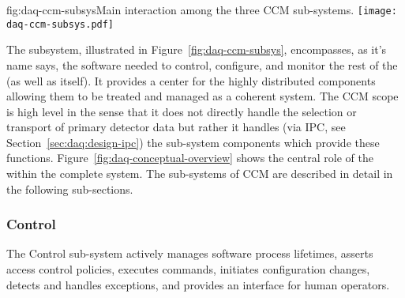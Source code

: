 
\begin{dunefigure}{fig:daq-ccm-subsys}{Main interaction among the three CCM sub-systems.}
  \texttt{[image: daq-ccm-subsys.pdf]}
\end{dunefigure}

The  subsystem, illustrated in Figure~\ref{fig:daq-ccm-subsys}, encompasses, as it's name says, the software needed to control, configure, and monitor the rest of the  (as well as itself).
It provides a center for the highly distributed  components allowing them to be treated and managed as a coherent system. 
The CCM scope is high level in the sense that it does not directly handle the selection or transport of primary detector data but rather it handles (via IPC, see Section~\ref{sec:daq:design-ipc}) the sub-system components which provide these functions.
Figure~\ref{fig:daq-conceptual-overview} shows the central role of the  within the complete  system.
The sub-systems of CCM are described in detail in the following sub-sections.


\subsubsection{Control}
\label{sec:daq:design:ccm:control}


The Control sub-system actively manages  software process lifetimes, asserts access control policies, executes commands, initiates configuration changes, detects and handles exceptions, and provides an interface for human operators.



